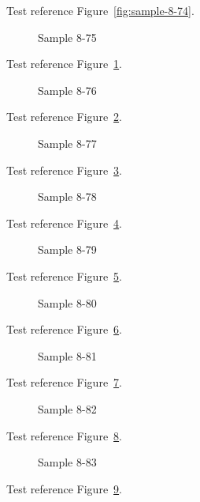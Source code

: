 Test reference Figure~\ref{fig:sample-8-74}.

\begin{figure}[tbhp]
\caption{Sample 8-75}
\label{fig:sample-8-75}
\end{figure}

Test reference Figure~\ref{fig:sample-8-75}.

\begin{figure}[tbhp]
\caption{Sample 8-76}
\label{fig:sample-8-76}
\end{figure}

Test reference Figure~\ref{fig:sample-8-76}.

\begin{figure}[tbhp]
\caption{Sample 8-77}
\label{fig:sample-8-77}
\end{figure}

Test reference Figure~\ref{fig:sample-8-77}.

\begin{figure}[tbhp]
\caption{Sample 8-78}
\label{fig:sample-8-78}
\end{figure}

Test reference Figure~\ref{fig:sample-8-78}.

\begin{figure}[tbhp]
\caption{Sample 8-79}
\label{fig:sample-8-79}
\end{figure}

Test reference Figure~\ref{fig:sample-8-79}.

\begin{figure}[tbhp]
\caption{Sample 8-80}
\label{fig:sample-8-80}
\end{figure}

Test reference Figure~\ref{fig:sample-8-80}.

\begin{figure}[tbhp]
\caption{Sample 8-81}
\label{fig:sample-8-81}
\end{figure}

Test reference Figure~\ref{fig:sample-8-81}.

\begin{figure}[tbhp]
\caption{Sample 8-82}
\label{fig:sample-8-82}
\end{figure}

Test reference Figure~\ref{fig:sample-8-82}.

\begin{figure}[tbhp]
\caption{Sample 8-83}
\label{fig:sample-8-83}
\end{figure}

Test reference Figure~\ref{fig:sample-8-83}.

